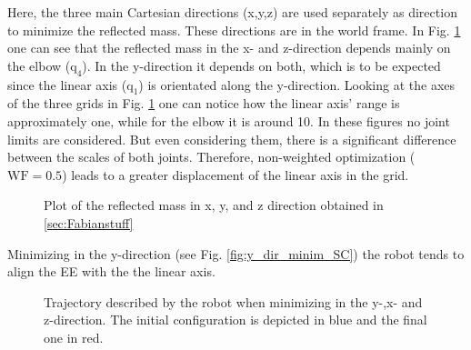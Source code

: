 Here, the three main Cartesian directions (x,y,z) are used separately as direction to minimize the reflected mass. These directions are in the world frame. In Fig. \ref{fig:reflected_mass_cart_directions}  one can see that the reflected mass in the x- and z-direction depends mainly on the elbow ($\mathrm{q_4}$). In the y-direction it depends on both, which is to be expected since the linear axis ($\mathrm{q_1}$) is orientated along the y-direction. Looking at the axes of the three grids in Fig. \ref{fig:reflected_mass_cart_directions} one can notice how the linear axis' range is approximately one, while for the elbow it is around 10. In these figures no joint limits are considered. But even considering them, there is a significant difference between the scales of both joints. Therefore, non-weighted  optimization ($\mathrm{WF = 0.5}$) leads to a greater displacement of the linear axis in the grid. \\
%
\begin{figure}[htp!]
	\centering	
	 	 	
	\caption{Plot of the reflected mass in x, y, and z direction obtained in \ref{sec:Fabianstuff}}
	\label{fig:reflected_mass_cart_directions}
\end{figure}
%
%
Minimizing in the y-direction (see Fig. \ref{fig:y_dir_minim_SC}) the robot tends to align the EE with the the linear axis.
\begin{figure}[htp!]
	\centering	
	 	 	
	\caption{Trajectory described by the robot when minimizing in the y-,x- and z-direction. The initial configuration is depicted in blue and the final one in red. }
	\label{fig:dir_minim_SC}
\end{figure}
